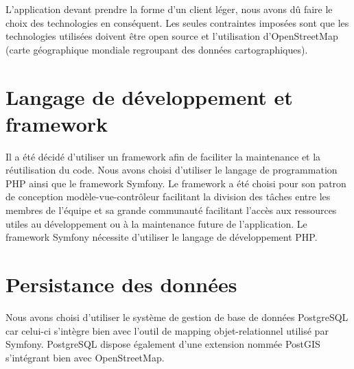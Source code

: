 

L'application devant prendre la forme d'un client léger, nous avons dû faire le choix des technologies en conséquent. Les seules contraintes imposées sont que les technologies utilisées doivent être open source et l'utilisation d'OpenStreetMap (carte géographique mondiale regroupant des données cartographiques).

\section{Langage de développement et framework}
Il a été décidé d'utiliser un framework afin de faciliter la maintenance et la réutilisation du code.
Nous avons choisi d'utiliser le langage de programmation PHP ainsi que le framework Symfony. Le framework a été choisi pour son patron de conception modèle-vue-contrôleur facilitant la division des tâches entre les membres de l'équipe et sa grande communauté facilitant l'accès aux ressources utiles au développement ou à la maintenance future de l'application.
Le framework Symfony nécessite d'utiliser le langage de développement PHP. 

\section{Persistance des données}
Nous avons choisi d'utiliser le système de gestion de base de données PostgreSQL car celui-ci s'intègre bien avec l'outil de mapping objet-relationnel utilisé par Symfony. PostgreSQL dispose également d'une extension nommée PostGIS s'intégrant bien avec OpenStreetMap.